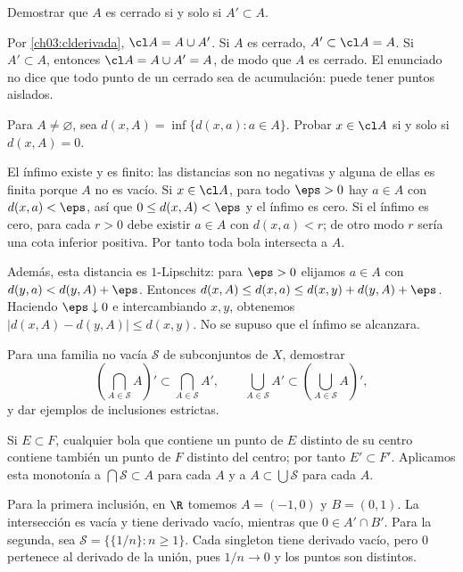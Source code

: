 \begin{ejercicio}
Demostrar que $A$ es cerrado si y solo si $A'\subset A$.
\end{ejercicio}
\begin{solucion}
Por \eqref{ch03:clderivada}, $\cl A=A\cup A'$. Si $A$ es cerrado, $A'\subset\cl A=A$. Si $A'\subset A$, entonces $\cl A=A\cup A'=A$, de modo que $A$ es cerrado. El enunciado no dice que todo punto de un cerrado sea de acumulación: puede tener puntos aislados.
\end{solucion}

\begin{ejercicio}
Para $A\ne\varnothing$, sea $d(x,A)=\inf\{d(x,a):a\in A\}$. Probar $x\in\cl A$ si y solo si $d(x,A)=0$.
\end{ejercicio}
\begin{solucion}
El ínfimo existe y es finito: las distancias son no negativas y alguna de ellas es finita porque $A$ no es vacío. Si $x\in\cl A$, para todo $\eps>0$ hay $a\in A$ con $d(x,a)<\eps$, así que $0\le d(x,A)<\eps$ y el ínfimo es cero. Si el ínfimo es cero, para cada $r>0$ debe existir $a\in A$ con $d(x,a)<r$; de otro modo $r$ sería una cota inferior positiva. Por tanto toda bola intersecta a $A$.

Además, esta distancia es $1$-Lipschitz: para $\eps>0$ elijamos $a\in A$ con $d(y,a)<d(y,A)+\eps$. Entonces $d(x,A)\le d(x,a)\le d(x,y)+d(y,A)+\eps$. Haciendo $\eps\downarrow0$ e intercambiando $x,y$, obtenemos $|d(x,A)-d(y,A)|\le d(x,y)$. No se supuso que el ínfimo se alcanzara.
\end{solucion}

\begin{ejercicio}
Para una familia no vacía $\mathcal S$ de subconjuntos de $X$, demostrar
\[
\left(\bigcap_{A\in\mathcal S}A\right)'\subset\bigcap_{A\in\mathcal S}A',\qquad
\bigcup_{A\in\mathcal S}A'\subset\left(\bigcup_{A\in\mathcal S}A\right)',
\]
y dar ejemplos de inclusiones estrictas.
\end{ejercicio}
\begin{solucion}
Si $E\subset F$, cualquier bola que contiene un punto de $E$ distinto de su centro contiene también un punto de $F$ distinto del centro; por tanto $E'\subset F'$. Aplicamos esta monotonía a $\bigcap\mathcal S\subset A$ para cada $A$ y a $A\subset\bigcup\mathcal S$ para cada $A$.

Para la primera inclusión, en $\R$ tomemos $A=(-1,0)$ y $B=(0,1)$. La intersección es vacía y tiene derivado vacío, mientras que $0\in A'\cap B'$. Para la segunda, sea $\mathcal S=\{\{1/n\}:n\ge1\}$. Cada singleton tiene derivado vacío, pero $0$ pertenece al derivado de la unión, pues $1/n\to0$ y los puntos son distintos.
\end{solucion}

